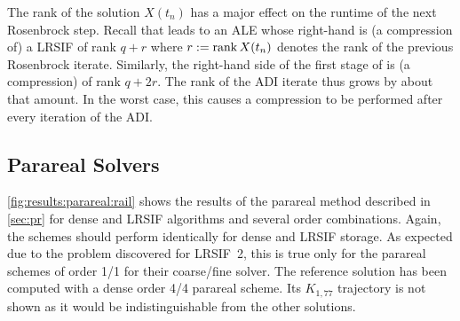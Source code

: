 The rank of the solution $X(t_n)$ has a major effect on the runtime of the next Rosenbrock step.
Recall that  leads to an \ac{ALE} whose right-hand is (a compression of) a \ac{LRSIF} of rank $q+r$
where $r := \operatorname{rank} X(t_n)$ denotes the rank of the previous Rosenbrock iterate.
Similarly, the right-hand side of the first stage of  is (a compression) of rank $q + 2r$.
The rank of the \ac{ADI} iterate thus grows by about that amount.
In the worst case, this causes a compression to be performed after every iteration of the \ac{ADI}.

\pagebreak

\subsection{Parareal Solvers}
\label{sec:results:parareal}

\autoref{fig:results:parareal:rail} shows the results of the parareal method described in \autoref{sec:pr}
for dense and \ac{LRSIF} algorithms and several order combinations.
Again, the schemes should perform identically for dense and \ac{LRSIF} storage.
As expected due to the problem discovered for \ac{LRSIF}~2,
this is true only for the parareal schemes of order 1/1 for their coarse/fine solver.
The reference solution has been computed with a dense order 4/4 parareal scheme.
Its $K_{1,77}$ trajectory is not shown as it would be indistinguishable from the other solutions.

